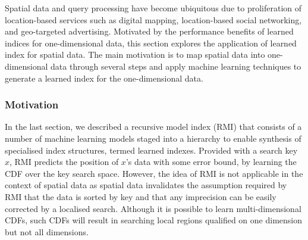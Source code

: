 Spatial data and query processing have become ubiquitous due to proliferation of location-based services such as digital mapping, location-based social networking,
and geo-targeted advertising. Motivated by the performance benefits of learned indices
for one-dimensional data, this section explores the application of learned index for spatial data. The main motivation is to map spatial data into one-dimensional data through several steps and apply machine learning techniques to generate a learned index for the one-dimensional data.

\subsubsection{Motivation}

In the last section, we described a recursive model index (RMI) that consists of a number of machine learning models staged into a hierarchy to enable synthesis of specialised index structures, termed learned indexes. Provided with a search key $x$, RMI predicts the position of $x$'s data with some error bound, by learning the CDF over the key search space. However, the idea of RMI is not applicable in the context of spatial data as spatial data invalidates the assumption required by RMI that the data is sorted by key and that any imprecision can be easily corrected by a localised search. Although it is possible to learn multi-dimensional CDFs, such CDFs will result in searching local regions qualified on one dimension but not all dimensions.


